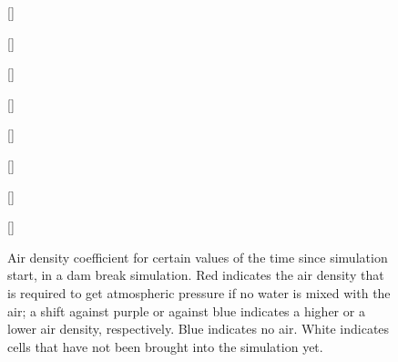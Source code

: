 \begin{figure}
    \centering
    [\screenshotwidth]{
        \begin{tikzpicture}[x={(\screenshotunitlength,0)},y={(0,\screenshotunitlength)}]
        
        \end{tikzpicture}
    }
    [\screenshotwidth]{
        \begin{tikzpicture}[x={(\screenshotunitlength,0)},y={(0,\screenshotunitlength)}]
        
        \end{tikzpicture}
    }
    [\screenshotwidth]{
       \begin{tikzpicture}[x={(\screenshotunitlength,0)},y={(0,\screenshotunitlength)}]
       
       \end{tikzpicture}
    }
    [\screenshotwidth]{
        \begin{tikzpicture}[x={(\screenshotunitlength,0)},y={(0,\screenshotunitlength)}]
        
        \end{tikzpicture}
    }
    [\screenshotwidth]{
        \begin{tikzpicture}[x={(\screenshotunitlength,0)},y={(0,\screenshotunitlength)}]
        
        \end{tikzpicture}
    }
    [\screenshotwidth]{
        \begin{tikzpicture}[x={(\screenshotunitlength,0)},y={(0,\screenshotunitlength)}]
        
        \end{tikzpicture}
    }
    [\screenshotwidth]{
        \begin{tikzpicture}[x={(\screenshotunitlength,0)},y={(0,\screenshotunitlength)}]
        
        \end{tikzpicture}
    }
    [\screenshotwidth]{
        \begin{tikzpicture}[x={(\screenshotunitlength,0)},y={(0,\screenshotunitlength)}]
        
        \end{tikzpicture}
    }
    \caption{Air density coefficient for certain values of the time since simulation start, in a dam break simulation. Red indicates the air density that is required to get atmospheric pressure if no water is mixed with the air; a shift against purple or against blue indicates a higher or a lower air density, respectively. Blue indicates no air. White indicates cells that have not been brought into the simulation yet.}
    \label{fig:screenshots_air_volume_coefficient}
\end{figure}

